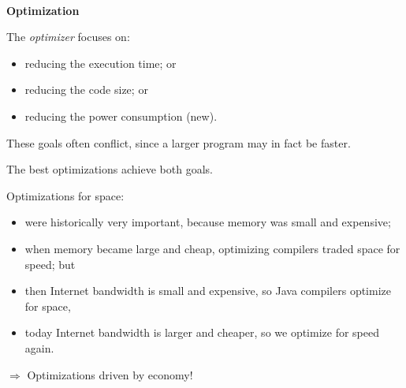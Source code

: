 



\begin{slide*}
\begin{tabbing}
~\\
{\Huge\bf Optimization}\\
\end{tabbing}

\vspace{0.4in}

\begin{center}
\end{center}

\vfil
\end{slide*}
 
\begin{slide*}
The {\em optimizer\/} focuses on:
\begin{itemize}
\item reducing the execution time; or
\item reducing the code size; or 
\item reducing the power consumption (new).
\end{itemize}
These goals often conflict, since
a larger program may in fact be faster.

The best optimizations achieve both goals.
\vfil
\end{slide*}
 
\begin{slide*}
Optimizations for space:
\begin{itemize}
\item were historically very important, because memory was small and expensive;
\item when memory became large and cheap, optimizing compilers traded space for speed; but
\item then Internet bandwidth is small and expensive, so Java compilers optimize
for space, 
\item today Internet bandwidth is larger and cheaper, so we optimize for speed
again.
\end{itemize}
$\Rightarrow$ Optimizations driven by economy!

\vfil
\end{slide*}
 
